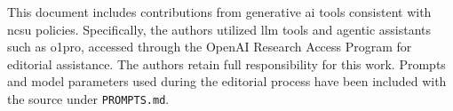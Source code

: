 \begin{aideclaration}
This document includes contributions from generative \acrshort{ai} tools consistent with \acrshort{ncsu} policies. Specifically, the authors utilized \acrfull{llm} tools and agentic assistants such as \acrfull{o1pro}, accessed through the OpenAI Research Access Program for editorial assistance. The authors retain full responsibility for this work. Prompts and model parameters used during the editorial process have been included with the source under \texttt{PROMPTS.md}. 
\end{aideclaration}